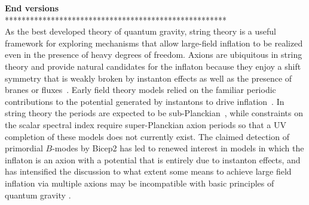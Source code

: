{\bf End versions}\\
*****************************************************\\

As the best developed theory of quantum gravity, string theory is a useful framework for exploring mechanisms that allow large-field inflation to be realized even in the presence of heavy degrees of freedom. Axions are ubiquitous in string theory and provide natural candidates for the inflaton because they enjoy a shift symmetry that is weakly broken by instanton effects as well as the presence of branes or fluxes~\cite{Wen:1985jz}. Early field theory models relied on the familiar periodic contributions to the potential generated by instantons to drive inflation~\cite{Freese:1990rb,Adams:1992bn}. In string theory the periods are expected to be sub-Planckian~\cite{Banks:2003sx,ArkaniHamed:2006dz}, while constraints on the scalar spectral index require super-Planckian axion periods so that a UV completion of these models does not currently exist. The claimed detection of primordial $B$-modes by {\sc Bicep}2 has led to renewed interest in models in which the inflaton is an axion with a potential that is entirely due to instanton effects, and has intensified the discussion to what extent some means to achieve large field inflation via multiple axions may be incompatible with basic principles of quantum gravity \cite{Kim:2004rp,Rudelius:2014wla,delaFuente:2014aca,Rudelius:2015xta,Brown:2015iha,Bachlechner:2015qja,Brown:2015lia,Heidenreich:2015wga,Heidenreich:2015nta,Kooner:2015rza}.



